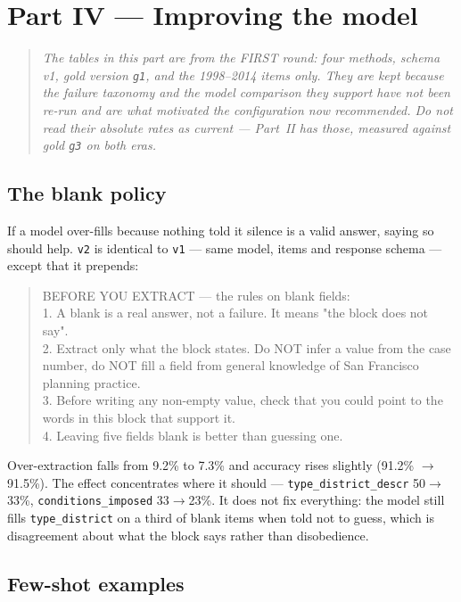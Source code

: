 \documentclass[11pt]{article}
\begin{document}
\section{Part IV --- Improving the model}

\begin{quote}\small\itshape
The tables in this part are from the FIRST round: four methods, schema v1, gold version
\texttt{g1}, and the 1998--2014 items only. They are kept because the failure taxonomy and the
model comparison they support have not been re-run and are what motivated the configuration
now recommended. Do not read their absolute rates as current --- Part~II has those, measured
against gold \texttt{g3} on both eras.
\end{quote}

\subsection{The blank policy}
\label{sec:v2}

If a model over-fills because nothing told it silence is a valid answer, saying so should
help. \texttt{v2} is identical to \texttt{v1} --- same model, items and response schema ---
except that it prepends:

\begin{quote}\small\ttfamily\sloppy
BEFORE YOU EXTRACT --- the rules on blank fields:\\[2pt]
1. A blank is a real answer, not a failure. It means "the block does not say".\\
2. Extract only what the block states. Do NOT infer a value from the case number, do NOT
fill a field from general knowledge of San Francisco planning practice.\\
3. Before writing any non-empty value, check that you could point to the words in this block
that support it.\\
4. Leaving five fields blank is better than guessing one.
\end{quote}

Over-extraction falls from 9.2\% to 7.3\% and accuracy rises slightly (91.2\%
$\rightarrow$ 91.5\%). The effect concentrates where it should ---
\texttt{type\_district\_descr} 50$\rightarrow$33\%, \texttt{conditions\_imposed}
33$\rightarrow$23\%. It does not fix everything: the model still fills
\texttt{type\_district} on a third of blank items when told not to guess, which is
disagreement about what the block says rather than disobedience.

\subsection{Few-shot examples}
\label{sec:fewshot}
\end{document}
